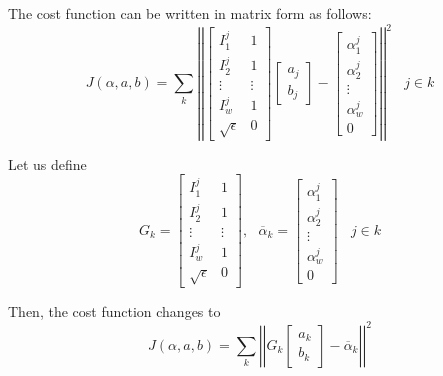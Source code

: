 \documentclass[journal]{IEEEtran}
\begin{document}
The cost function can be written in matrix form as follows:
\begin{equation}
    J(\alpha, a, b) = \sum\limits_{k} \left| \left|
        \begin{bmatrix}
        I_{1}^{j} & 1 \\ I_{2}^{j} & 1 \\
        \vdots & \vdots \\ I_{w}^{j} & 1 \\
        \sqrt{\epsilon} & 0
        \end{bmatrix} 
        \begin{bmatrix}
        a_j \\ b_j
        \end{bmatrix}
        -
        \begin{bmatrix}
        \alpha_1^j \\ \alpha_2^j \\
        \vdots \\ \alpha_w^j \\ 0
        \end{bmatrix}
    \right| \right|^2 ~~~~ j\in k
    \label{equ5}
\end{equation}

Let us define
\begin{equation}
    G_{k} = \begin{bmatrix}
            I_{1}^{j} & 1 \\ I_{2}^{j} & 1 \\
            \vdots & \vdots \\ I_{w}^{j} & 1 \\
            \sqrt{\epsilon} & 0
            \end{bmatrix},~~~
    \overline{\alpha}_{k} = \begin{bmatrix}
                            \alpha_1^j \\ \alpha_2^j \\
                            \vdots \\ \alpha_w^j \\ 0
                            \end{bmatrix} ~~~~ j\in k
    \label{equ6}
\end{equation}

Then, the cost function changes to
\begin{equation}
    J(\alpha, a, b) = \sum\limits_{k}\left|\left| G_k \begin{bmatrix} a_k \\ b_k \end{bmatrix} - \overline{\alpha}_{k} \right|\right|^2
    \label{equ7}
\end{equation}
\end{document}
